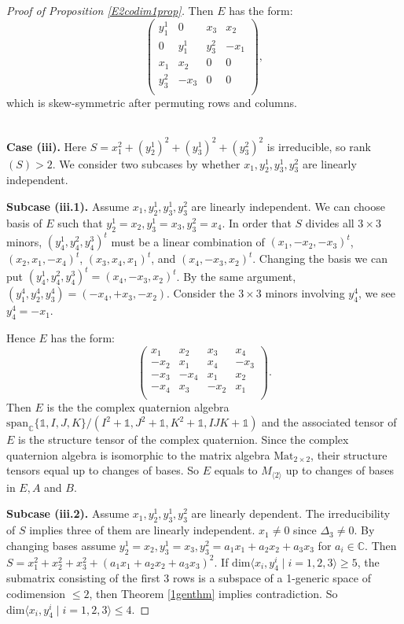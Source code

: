 \documentclass[10pt]{article} %
\theoremstyle{definition}
\begin{document}
\begin{proof}[Proof of Proposition \ref{E2codim1prop}]
Then $E$ has the form:
$$\begin{pmatrix}
y^1_1 & 0 & x_3 & x_2\\
0 & y^1_1 & y^2_3 & -x_1\\
x_1 & x_2 & 0   & 0 \\
y^2_3 & -x_3 & 0  & 0\\
\end{pmatrix},$$
which is skew-symmetric after permuting rows and columns.

~\\\textbf{Case (iii).} Here $S=x_1^2+(y^1_2)^2+(y^1_3)^2+(y^2_3)^2$ is irreducible, so rank$(S)>2$. We consider two subcases by whether $x_1,y^1_2,y^1_3,y^2_3$ are linearly independent.

\textbf{Subcase (iii.1).} Assume $x_1,y^1_2,y^1_3,y^2_3$ are linearly independent. We can choose basis of $E$ such that $y^1_2=x_2,y^1_3=x_3,y^2_3=x_4$. In order that $S$ divides all $3\times 3$ minors, $(y^1_4,y^2_4,y^3_4)^t$ must be a linear combination of $(x_1,-x_2,-x_3)^t$,  $(x_2,x_1,-x_4)^t$, $(x_3,x_4,x_1)^t$, and $(x_4,-x_3,x_2)^t$. Changing the basis we can put $(y^1_4,y^2_4,y^3_4)^t=(x_4,-x_3,x_2)^t$. By the same argument, $(y^4_1,y^4_2,y^4_3)=(-x_4,+x_3,-x_2)$. Consider the $3\times3$ minors involving $y^4_4$, we see $y^4_4=-x_1$.

Hence $E$ has the form:
\begin{equation*}
    \begin{pmatrix}
    x_1 & x_2 & x_3 & x_4 \\
    -x_2 & x_1 & x_4 & -x_3\\
    -x_3 & -x_4 & x_1 & x_2\\
    -x_4 & x_3 & -x_2 & x_1\\
    \end{pmatrix}.
\end{equation*}
Then $E$ is the the complex quaternion algebra $\mathrm{span}_{\mathbb{C}}\{\mathds{1},I,J,K\}/(I^2+\mathds{1},J^2+\mathds{1},K^2+\mathds{1},IJK+\mathds{1})$ and the associated tensor of $E$ is the structure tensor of the complex quaternion. Since the complex quaternion algebra is isomorphic to the matrix algebra $\mathrm{Mat}_{2\times2}$, their structure tensors equal up to changes of bases. So $E$ equals to $M_{\langle2\rangle}$ up to changes of bases in $E,A$ and $B$.

\textbf{Subcase (iii.2).} Assume $x_1,y^1_2,y^1_3,y^2_3$ are linearly dependent. The irreducibility of $S$ implies three of them are linearly independent. $x_1\neq0$ since $\Delta_3\neq 0$. By changing bases assume $y^1_2=x_2,y^1_3=x_3,y^2_3=a_1x_1+a_2x_2+a_3x_3$ for $a_i\in\mathbb{C}$. Then $S=x_1^2+x_2^2+x_3^2+(a_1x_1+a_2x_2+a_3x_3)^2$. If $\mathrm{dim}\langle x_i,y^i_4\mid i=1,2,3\rangle\geq 5$, the submatrix consisting of the first 3 rows is a subspace of a 1-generic space of codimension $\leq 2$, then Theorem \ref{1genthm} implies contradiction. So $\mathrm{dim}\langle x_i,y^i_4\mid i=1,2,3\rangle\leq 4$.


\end{proof}
\end{document}
